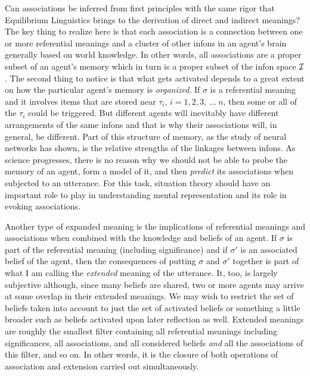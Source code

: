 Can associations be inferred from first principles with the same rigor that Equilibrium Linguistics brings to the derivation of direct and indirect meanings? The key thing to realize here is that each association is a connection between one or more referential meanings and a cluster of other infons in an agent's brain generally based on world knowledge. In other words, all associations are a proper subset of an agent's memory which in turn is a proper subset of the infon space $\cal I$. The second thing to notice is that what gets activated depends to a great extent on how the particular agent's memory is \emph{organized}. If $\sigma$ is a referential meaning and it involves items that are stored near $\tau_i$, $i = 1, 2, 3,\ \ldots\ n$, then some or all of the $\tau_i$ could be triggered. But different agents will inevitably have different arrangements of the same infons and that is why their associations will, in general, be different. Part of this structure of memory, as the study of neural networks has shown, is the relative strengths of the linkages between infons. As science progresses, there is no reason why we should not be able to probe the memory of an agent, form a model of it, and then \emph{predict} its associations when subjected to an utterance. For this task, situation theory should have an important role to play in understanding mental representation and its role in evoking associations.

Another type of expanded meaning is the implications of referential meanings and associations when combined with the knowledge and beliefs of an agent. If $\sigma$ is part of the referential meaning (including significance) and if $\sigma'$ is an associated belief of the agent, then the consequences of putting $\sigma$ and $\sigma'$ together is part of what I am calling the \emph{extended} meaning of the utterance. It, too, is largely subjective although, since many beliefs are shared, two or more agents may arrive at some overlap in their extended meanings. We may wish to restrict the set of beliefs taken into account to just the set of activated beliefs or something a little broader such as beliefs activated upon later reflection as well. Extended meanings are roughly the smallest filter containing all referential meanings including significances, all associations, and all considered beliefs \emph{and} all the associations of this filter, and so on. In other words, it is the closure of both operations of association and extension carried out simultaneously.

